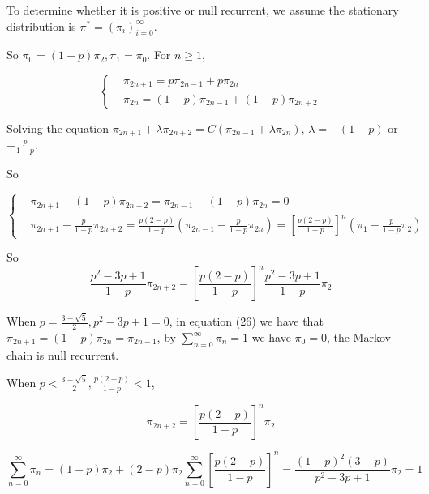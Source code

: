 \documentclass{article}
\begin{document}
To determine whether it is positive or null recurrent, we assume the stationary distribution is $\pi^* = (\pi_i)_{i=0}^{\infty}$.

So $\pi_0 = (1-p) \pi_2,\pi_1 = \pi_0$. For $n\geqslant 1$,

\begin{equation}
    \left\{\begin{aligned}
        & \pi_{2n+1} = p\pi_{2n-1} + p\pi_{2n} \\
        & \pi_{2n} = (1-p)\pi_{2n-1} + (1-p)\pi_{2n+2}
    \end{aligned}
    \right.
\end{equation}

Solving the equation $\pi_{2n+1} + \lambda \pi_{2n+2} = C(\pi_{2n-1} + \lambda \pi_{2n})$, $\lambda = - (1-p)$ or $- \frac{p}{1-p}$.

So 

\begin{equation}
    \left\{\begin{aligned}
        & \pi_{2n+1} - (1-p)\pi_{2n+2} = \pi_{2n-1} - (1-p)\pi_{2n} = 0 \\
        & \pi_{2n+1} - \frac{p}{1-p}\pi_{2n+2} = \frac{p(2-p)}{1-p} (\pi_{2n-1} - \frac{p}{1-p}\pi_{2n}) = \left[\frac{p(2-p)}{1-p}\right]^n (\pi_1 - \frac{p}{1-p} \pi_2)
    \end{aligned}
    \right.
\end{equation}

So \begin{equation}
    \frac{p^2 - 3p+1}{1-p} \pi_{2n+2} = \left[\frac{p(2-p)}{1-p}\right]^n \frac{p^2 - 3p+1}{1-p} \pi_{2}
\end{equation}

When $p = \frac{3-\sqrt{5}}{2},p^2-3p+1 = 0$, in equation (26) we have that $\pi_{2n+1} = (1-p) \pi_{2n} = \pi_{2n-1}$, by $\sum_{n=0}^{\infty} \pi_n=1$ we have $\pi_0 = 0$, the Markov chain is null recurrent.

When $ p<\frac{3-\sqrt{5}}{2},\frac{p(2-p)}{1-p}<1$,

\begin{equation}
    \pi_{2n+2} = \left[\frac{p(2-p)}{1-p}\right]^n \pi_{2}
\end{equation}

\begin{equation}
    \sum_{n=0}^{\infty} \pi_{n} = (1-p) \pi_2 + (2-p) \pi_2 \sum_{n=0}^{\infty}\left[\frac{p(2-p)}{1-p}\right]^n = \frac{(1-p)^2(3-p)}{p^2-3p+1} \pi_2 = 1
\end{equation}
\end{document}
